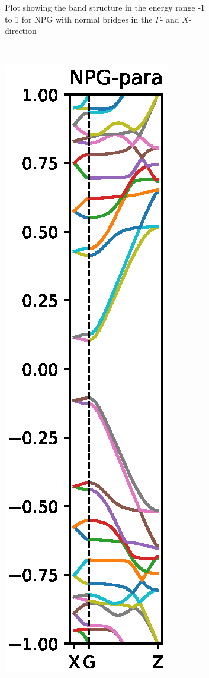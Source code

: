 \begin{figure}
\begin{subfigure}[b]{0.3\textwidth}
                \caption{Plot showing the band structure in the energy range -1 to 1 for NPG with normal bridges in the \(\Gamma\)- and \(X\)-direction}
        \label{Fabbs}
    \end{subfigure}
    ~ %
    \begin{subfigure}[b]{0.3\textwidth}
        \includegraphics[width=\textwidth]{Figures/name/paraNPGBS.eps}

\end{subfigure}
\end{figure}
